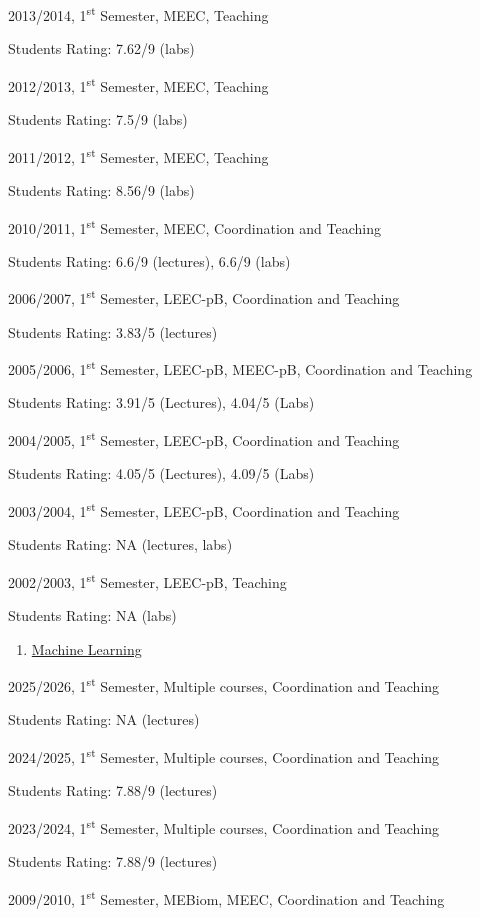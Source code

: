 \documentclass[
]{article}
\begin{document}
2013/2014, 1\textsuperscript{st} Semester, MEEC, Teaching

Students Rating: 7.62/9 (labs)

2012/2013, 1\textsuperscript{st} Semester, MEEC, Teaching

Students Rating: 7.5/9 (labs)

2011/2012, 1\textsuperscript{st} Semester, MEEC, Teaching

Students Rating: 8.56/9 (labs)

2010/2011, 1\textsuperscript{st} Semester, MEEC, Coordination and
Teaching

Students Rating: 6.6/9 (lectures), 6.6/9 (labs)

2006/2007, 1\textsuperscript{st} Semester, LEEC-pB, Coordination and
Teaching

Students Rating: 3.83/5 (lectures)

2005/2006, 1\textsuperscript{st} Semester, LEEC-pB, MEEC-pB,
Coordination and Teaching

Students Rating: 3.91/5 (Lectures), 4.04/5 (Labs)

2004/2005, 1\textsuperscript{st} Semester, LEEC-pB, Coordination and
Teaching

Students Rating: 4.05/5 (Lectures), 4.09/5 (Labs)

2003/2004, 1\textsuperscript{st} Semester, LEEC-pB, Coordination and
Teaching

Students Rating: NA (lectures, labs)

2002/2003, 1\textsuperscript{st} Semester, LEEC-pB, Teaching

Students Rating: NA (labs)

\begin{enumerate}
\def\labelenumi{\arabic{enumi}.}
\setcounter{enumi}{3}
\item
  \ul{Machine Learning}
\end{enumerate}

2025/2026, 1\textsuperscript{st} Semester, Multiple courses,
Coordination and Teaching

Students Rating: NA (lectures)

2024/2025, 1\textsuperscript{st} Semester, Multiple courses,
Coordination and Teaching

Students Rating: 7.88/9 (lectures)

2023/2024, 1\textsuperscript{st} Semester, Multiple courses,
Coordination and Teaching

Students Rating: 7.88/9 (lectures)

2009/2010, 1\textsuperscript{st} Semester, MEBiom, MEEC, Coordination
and Teaching
\end{document}
